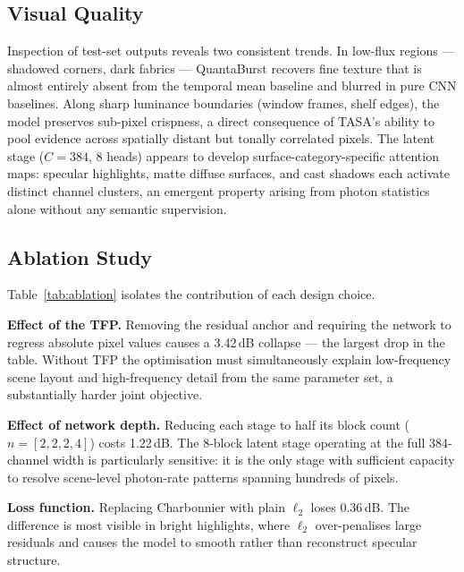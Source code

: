 \documentclass[10pt,twocolumn,letterpaper]{article}
\begin{document}
\subsection{Visual Quality}

Inspection of test-set outputs reveals two consistent trends.
In low-flux regions --- shadowed corners, dark fabrics ---
QuantaBurst recovers fine texture that is almost entirely absent
from the temporal mean baseline and blurred in pure CNN baselines.
Along sharp luminance boundaries (window frames, shelf edges),
the model preserves sub-pixel crispness, a direct consequence of
TASA's ability to pool evidence across spatially distant but
tonally correlated pixels.
The latent stage ($C{=}384$, 8 heads) appears to develop
surface-category-specific attention maps: specular highlights,
matte diffuse surfaces, and cast shadows each activate distinct
channel clusters, an emergent property arising from photon
statistics alone without any semantic supervision.

\subsection{Ablation Study}

Table~\ref{tab:ablation} isolates the contribution of each
design choice.

\noindent\textbf{Effect of the TFP.}
Removing the residual anchor and requiring the network to regress
absolute pixel values causes a 3.42\,dB collapse --- the largest
drop in the table.  Without TFP the optimisation must simultaneously
explain low-frequency scene layout and high-frequency detail from
the same parameter set, a substantially harder joint objective.

\noindent\textbf{Effect of network depth.}
Reducing each stage to half its block count ($n{=}[2,2,2,4]$) costs
1.22\,dB.  The 8-block latent stage operating at the full 384-channel
width is particularly sensitive: it is the only stage with
sufficient capacity to resolve scene-level photon-rate patterns
spanning hundreds of pixels.

\noindent\textbf{Loss function.}
Replacing Charbonnier with plain $\ell_2$ loses 0.36\,dB.
The difference is most visible in bright highlights, where
$\ell_2$ over-penalises large residuals and causes the model to
smooth rather than reconstruct specular structure.
\end{document}
